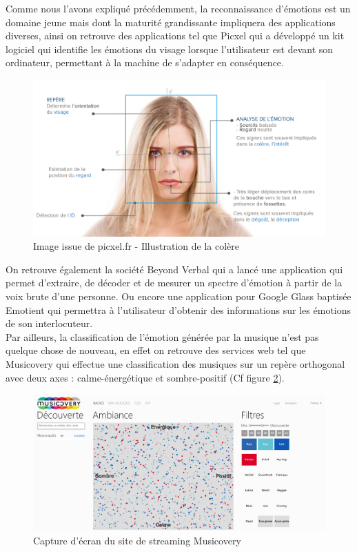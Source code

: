 Comme nous l’avons expliqué précédemment, la reconnaissance d’émotions est un domaine jeune mais dont la maturité grandissante impliquera des applications diverses, ainsi on retrouve des applications tel que Picxel qui a développé un kit logiciel qui identifie les émotions du visage lorsque l'utilisateur est devant son ordinateur, permettant à la machine de s'adapter en conséquence.

\begin{figure}[htp]
\centering
\includegraphics[scale=0.9]{./images/etatArt1.png}
\caption{Image issue de picxel.fr - Illustration de la colère}
\label{eA1}
\end{figure}

On retrouve également la société Beyond Verbal qui a lancé une application qui permet d’extraire, de décoder et de mesurer un spectre d’émotion à partir de la voix brute d’une personne.
Ou encore une application pour Google Glass baptisée Emotient qui permettra à l’utilisateur d’obtenir des informations sur les émotions de son interlocuteur.\\

Par ailleurs, la classification de l’émotion générée par la musique n’est pas quelque chose de nouveau, en effet on retrouve des services web tel que Musicovery qui effectue une classification des musiques sur un repère orthogonal avec deux axes : calme-énergétique et sombre-positif (Cf figure \ref{eA2}).

\begin{figure}[htp]
\centering
\includegraphics[scale=1.0]{./images/etatArt2.png}
\caption{Capture d'écran du site de streaming Musicovery}
\label{eA2}
\end{figure}

